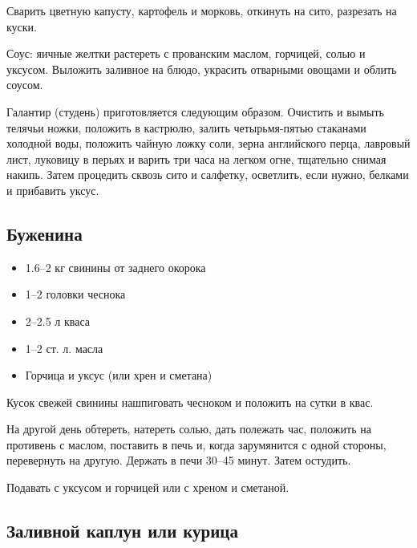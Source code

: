 Сварить цветную капусту, картофель и морковь, откинуть на сито, разрезать на куски.

Соус: яичные желтки растереть с прованским маслом, горчицей, солью и уксусом. Выложить заливное на блюдо, украсить отварными овощами и облить соусом.

Галантир (студень) приготовляется следующим образом. Очистить и вымыть телячьи ножки, положить в кастрюлю, залить четырьмя-пятью стаканами холодной воды, положить чайную ложку соли, зерна английского перца, лавровый лист, луковицу в перьях и варить три часа на легком огне, тщательно снимая накипь. Затем процедить сквозь сито и салфетку, осветлить, если нужно, белками и прибавить уксус.

\subsection{Буженина}

\begin{itemize}
	\item 1.6–2 кг свинины от заднего окорока
    \item 1–2 головки чеснока
    \item 2–2.5 л кваса
    \item 1–2 ст. л. масла 
    \item Горчица и уксус (или хрен и сметана)
\end{itemize}

Кусок свежей свинины нашпиговать чесноком и положить на сутки в квас.

На другой день обтереть, натереть солью, дать полежать час, положить на противень с маслом, поставить в печь и, когда зарумянится с одной стороны, перевернуть на другую. Держать в печи 30–45 минут. Затем остудить.

Подавать с уксусом и горчицей или с хреном и сметаной.

\subsection{Заливной каплун или курица}


